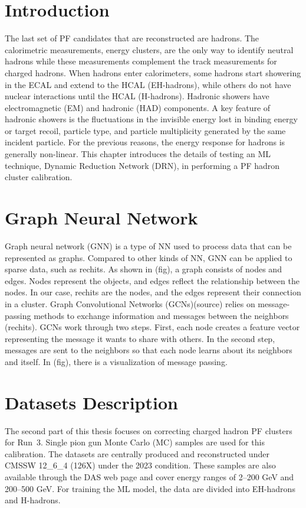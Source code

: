 \section{Introduction}
The last set of PF candidates that are reconstructed are hadrons. The calorimetric measurements, energy clusters, are the only way to identify neutral hadrons while these measurements complement the track measurements for charged hadrons. When hadrons enter calorimeters, some hadrons start showering in the ECAL and extend to the HCAL (EH-hadrons), while others do not have nuclear interactions until the HCAL (H-hadrons). Hadronic showers have electromagnetic (EM) and hadronic (HAD) components. A key feature of hadronic showers is the fluctuations in the invisible energy lost in binding energy or target recoil, particle type, and particle multiplicity generated by the same incident particle. %
For the previous reasons, the energy response for hadrons is generally non-linear.
This chapter introduces the details of testing an ML technique, Dynamic Reduction Network (DRN), in performing a PF hadron cluster calibration.


\section{Graph Neural Network} %
Graph neural network (GNN) is a type of NN used to process data that can be represented as graphs. Compared to other kinds of NN, GNN can be applied to sparse data, such as rechits. %
As shown in (fig), a graph consists of nodes and edges. Nodes represent the objects, and edges reflect the relationship between the nodes. In our case, rechits are the nodes, and the edges represent their connection in a cluster. Graph Convolutional Networks (GCNs)(source) relies on message-passing methods to exchange information and messages between the neighbors (rechits). GCNs work through two steps. First, each node creates a feature vector representing the message it wants to share with others. In the second step, messages are sent to the neighbors so that each node learns about its neighbors and itself. In (fig), there is a visualization of message passing.

\section{Datasets Description}
The second part of this thesis focuses on correcting charged hadron PF clusters for Run~3. Single pion gun Monte Carlo (MC) samples are used for this calibration. The datasets are centrally produced and reconstructed under CMSSW 12\_6\_4 (126X) under the 2023 condition. These samples are also available through the DAS web page and cover energy ranges of 2--200 GeV and 200--500 GeV. For training the ML model, the data are divided into EH-hadrons and H-hadrons. %

